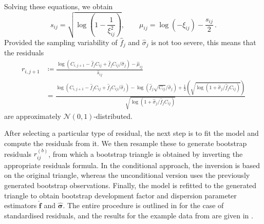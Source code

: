 \documentclass[a4paper]{book}
\begin{document}
Solving these equations, we obtain
\begin{equation}
  s_{ij} = \sqrt{\log \left( 1 - \frac{1}{\xi^2_{ij}} \right)}, \qquad \mu_{ij} = \log(-\xi_{ij}) - \frac{s_{ij}}{2} \,.
\end{equation}
Provided the sampling variability of $\widehat{f}_j$ and $\widehat{\sigma}_j$ is not too severe, this means that the residuals
\begin{align} \label{eq:log-normal-resids}
  r_{i, j + 1} 
  &\coloneqq \frac{\log \left( C_{i, j + 1} - \widehat{f}_j C_{ij} + \widehat{f}_j C_{ij} / \widehat{\sigma}_j \right) - \widehat{\mu}_{ij}}{\widehat{s}_{ij}} \\
  &= \frac{\log \left( C_{i, j + 1} - \widehat{f}_j C_{ij} + \widehat{f}_j C_{ij} / \widehat{\sigma}_j \right) - \log(\widehat{f}_j \sqrt{C_{ij}} / \widehat{\sigma}_j) + \frac{1}{2} \left( \sqrt{\log \left( 1 + \widehat{\sigma}_j / \widehat{f}_j C_{ij} \right)} \right)}{\sqrt{\log \left( 1 + \widehat{\sigma}_j / \widehat{f}_j C_{ij} \right)}}
\end{align}
are approximately $\mathcal{N}(0, 1)$-distributed.

After selecting a particular type of residual, the next step is to fit the model and compute the residuals from it. We then resample these to generate bootstrap residuals $r^{(b)}_{ij}$, from which a bootstrap triangle is obtained by inverting the appropriate residuals formula. In the conditional approach, the inversion is based on the original triangle, whereas the unconditional version uses the previously generated bootstrap observations. Finally, the model is refitted to the generated triangle to obtain bootstrap development factor and dispersion parameter estimators $\widehat{\bm{f}}$ and $\widehat{\bm{\sigma}}$. The entire procedure is outlined in  for the case of standardised residuals, and the results for the example data from  are given in .
\end{document}
